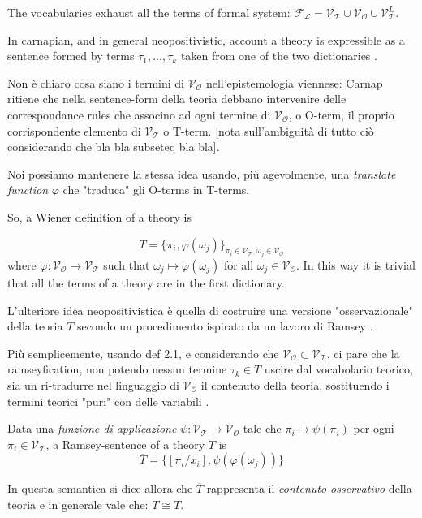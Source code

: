 The vocabularies exhaust all the terms of formal system: $\mathcal{F_L} = \mathcal{V_T} \cup \mathcal{V_O} \cup \mathcal{V}_{\mathcal{T}}^L$.

In carnapian, and in general neopositivistic, account a theory is expressible as a sentence formed by terms $\tau_1, \dots, \tau_k$ taken from one of the two dictionaries \cite{?}. 

Non è chiaro cosa siano i termini di $\mathcal{V_O}$ nell'epistemologia viennese: Carnap ritiene che nella sentence-form della teoria debbano intervenire delle correspondance rules che associno ad ogni termine di $\mathcal{V_O}$, o O-term, il proprio corrispondente elemento di $\mathcal{V_T}$ o T-term. [nota sull'ambiguità di tutto ciò considerando che bla bla subseteq bla bla].

Noi possiamo mantenere la stessa idea usando, più agevolmente, una \emph{translate function} $\varphi$ che "traduca" gli O-terms in T-terms. 

So, a Wiener definition of a theory is 

\[  T = \{ \pi_i, \varphi (\omega_j)\}_{\pi_i \in \mathcal{V_T}, \omega_j \in \mathcal{V_O}}
\] 
where $\varphi: \mathcal{V_O} \to \mathcal{V_T}$ such that $\omega_j \mapsto \varphi (\omega_j)$ for all $\omega_j \in \mathcal{V_O}$. In this way it is trivial that all the terms of a theory are in the first dictionary.

L'ulteriore idea neopositivistica è quella di costruire una versione "osservazionale" della teoria $T$ secondo un procedimento ispirato da un lavoro di Ramsey \cite{?}.


Più semplicemente, usando def 2.1, e considerando che $\mathcal{V_O} \subset \mathcal{V_T}$, ci pare che la ramseyfication, non potendo nessun termine $\tau_k \in T$ uscire dal vocabolario teorico, sia un ri-tradurre nel linguaggio di $\mathcal{V_O}$ il contenuto della teoria, sostituendo i termini teorici "puri" con delle variabili \cite{?}.
\begin{definition}
	Data una \emph{funzione di applicazione} $\psi: \mathcal{V_T} \to \mathcal{V_O}$ tale che $\pi_i \mapsto \psi (\pi_i) $ per ogni $\pi_i \in \mathcal{V_T}$, a Ramsey-sentence of a theory $T$ is 
	\[ \overline{T} = \{[\pi_i/x_i], \psi (\varphi (\omega_j))\} 
	\]
\end{definition}



In questa semantica si dice allora che $\overline{T}$ rappresenta il \emph{contenuto osservativo} della teoria e in generale vale che: $T \cong \overline{T}$. 



